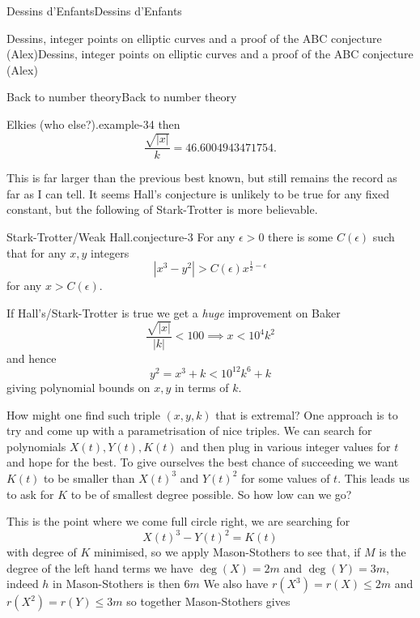 \documentclass[10pt,]{book}
\numberwithin{equation}{section}
\newcommand{\lt}{<}
\newcommand{\gt}{>}
\begin{document}
\begin{chapterptx}{Dessins d'Enfants}{}{Dessins d'Enfants}{}{}
\begin{sectionptx}{Dessins, integer points on elliptic curves and a proof of the ABC conjecture (Alex)}{}{Dessins, integer points on elliptic curves and a proof of the ABC conjecture (Alex)}{}{}
\begin{subsectionptx}{Back to number theory}{}{Back to number theory}{}{}
\begin{example}{Elkies (who else?).}{example-34}
then%
\begin{equation*}
\frac{\sqrt{|x|}}{k} = 46.6004943471754\text{.}
\end{equation*}
%
\end{example}
\hypertarget{p-715}{}%
This is far larger than the previous best known, but still remains the record as far as I can tell. It seems Hall's conjecture is unlikely to be true for any fixed constant, but the following of Stark-Trotter is more believable.%
\begin{conjecture}{Stark-Trotter/Weak Hall.}{}{conjecture-3}%
\hypertarget{p-716}{}%
For any  \(\epsilon \gt 0\) there is some \(C(\epsilon)\) such that for any \(x,y\) integers%
\begin{equation*}
|x^3 - y^2| \gt C(\epsilon) x^{\frac12 - \epsilon}
\end{equation*}
for any \(x \gt C(\epsilon)\).%
\end{conjecture}
\hypertarget{p-717}{}%
If Hall's/Stark-Trotter is true we get a \emph{huge} improvement on Baker%
\begin{equation*}
\frac{\sqrt{|x|}}{|k|} \lt 100 \implies x \lt 10^4k^2
\end{equation*}
and hence%
\begin{equation*}
y^2 = x^3 + k \lt 10^{12}k^6 + k
\end{equation*}
giving polynomial bounds on \(x,y\) in terms of \(k\).%
\par
\hypertarget{p-718}{}%
How might one find such triple \((x,y,k)\) that is extremal? One approach is to try and come up with a parametrisation of nice triples. We can search for polynomials \(X(t),Y(t), K(t)\) and then plug in various integer values for \(t\) and hope for the best. To give ourselves the best chance of succeeding we want \(K(t)\) to be smaller than \(X(t)^3\) and \(Y(t)^2\) for some values of \(t\). This leads us to ask for \(K\) to be of smallest degree possible. So how low can we go?%
\par
\hypertarget{p-719}{}%
This is the point where we come full circle right, we are searching for%
\begin{equation*}
X(t)^3 - Y(t)^2 = K(t)
\end{equation*}
with degree of \(K\) minimised, so we apply Mason-Stothers to see that, if \(M\) is the degree of the left hand terms we have \(\deg(X) = 2m\) and \(\deg (Y) = 3m\), indeed \(h\) in Mason-Stothers is then \(6m\) We also have \(r(X^3) = r(X) \le 2m\) and \(r(X^2) = r(Y) \le 3m\) so together Mason-Stothers gives%
\begin{equation*}

\end{equation*}
\end{subsectionptx}
\end{sectionptx}
\end{chapterptx}
\end{document}
